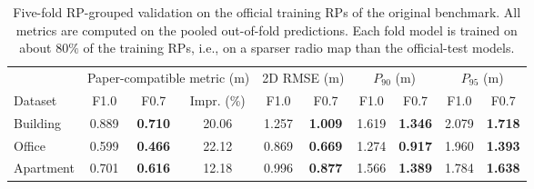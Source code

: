 \begin{table}[!t]
\centering
\caption{Five-fold RP-grouped validation on the official training RPs of the original benchmark. All metrics are computed on the pooled out-of-fold predictions. Each fold model is trained on about $80\%$ of the training RPs, i.e., on a sparser radio map than the official-test models.}
\label{tab:grouped_cv}
\footnotesize
\setlength{\tabcolsep}{4.5pt}
\begin{tabular}{lccccccccc}
\toprule
 & \multicolumn{3}{c}{Paper-compatible metric (m)} & \multicolumn{2}{c}{2D RMSE (m)} & \multicolumn{2}{c}{$P_{90}$ (m)} & \multicolumn{2}{c}{$P_{95}$ (m)} \\
\cmidrule(lr){2-4}\cmidrule(lr){5-6}\cmidrule(lr){7-8}\cmidrule(lr){9-10}
Dataset & F1.0 & F0.7 & Impr. (\%) & F1.0 & F0.7 & F1.0 & F0.7 & F1.0 & F0.7 \\
\midrule
Building & 0.889 & \textbf{0.710} & 20.06 & 1.257 & \textbf{1.009} & 1.619 & \textbf{1.346} & 2.079 & \textbf{1.718} \\
Office & 0.599 & \textbf{0.466} & 22.12 & 0.869 & \textbf{0.669} & 1.274 & \textbf{0.917} & 1.960 & \textbf{1.393} \\
Apartment & 0.701 & \textbf{0.616} & 12.18 & 0.996 & \textbf{0.877} & 1.566 & \textbf{1.389} & 1.784 & \textbf{1.638} \\
\bottomrule
\end{tabular}
\end{table}
